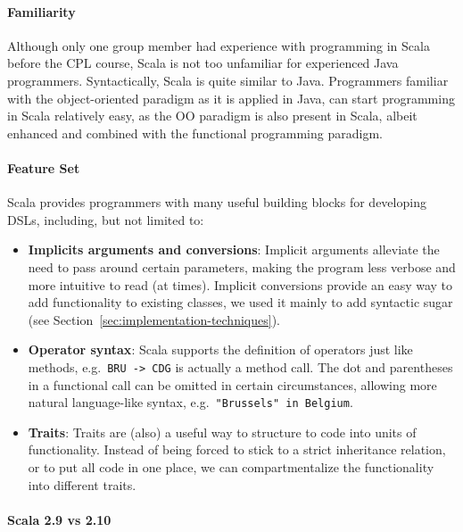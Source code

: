\documentclass[a4paper]{article}
\renewcommand{\sc}[1]{\lstinline{#1}}
\begin{document}
\paragraph{Familiarity}
Although only one group member had experience with programming in Scala before the \textsc{CPL} course, Scala is not too unfamiliar for experienced Java programmers.
Syntactically, Scala is quite similar to Java.
Programmers familiar with the object-oriented paradigm as it is applied in Java, can start programming in Scala relatively easy, as the \textsc{OO} paradigm is also present in Scala, albeit enhanced and combined with the functional programming paradigm.

\paragraph{Feature Set}
Scala provides programmers with many useful building blocks for developing DSLs, including, but not limited to:

\begin{itemize}
\item \textbf{Implicits arguments and conversions}:
  Implicit arguments alleviate the need to pass around certain parameters, making the program less verbose and more intuitive to read (at times).
  Implicit conversions provide an easy way to add functionality to existing classes, we used it mainly to add syntactic sugar (see Section~\ref{sec:implementation-techniques}).
\item \textbf{Operator syntax}:
  Scala supports the definition of operators just like methods, e.g.\ \sc{BRU -> CDG} is actually a method call.
  The dot and parentheses in a functional call can be omitted in certain circumstances, allowing more natural language-like syntax, e.g.\ \sc{"Brussels" in Belgium}.
\item \textbf{Traits}:
  Traits are (also) a useful way to structure to code into units of functionality.
  Instead of being forced to stick to a strict inheritance relation, or to put all code in one place, we can compartmentalize the functionality into different traits.
\end{itemize}

\paragraph{Scala 2.9 vs 2.10}
\end{document}
